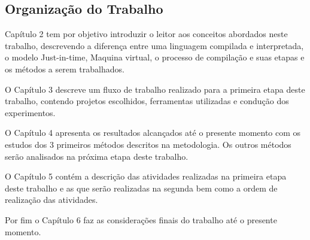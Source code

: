\subsection{Organização do Trabalho}

Capítulo 2 tem por objetivo introduzir o leitor aos conceitos abordados
 neste trabalho, descrevendo a diferença entre uma linguagem compilada e
 interpretada, o modelo Just-in-time, Maquina virtual, o processo de compilação
 e suas etapas e os métodos a serem trabalhados.

O Capítulo 3 descreve um fluxo de trabalho realizado para a primeira etapa
 deste trabalho, contendo projetos escolhidos, ferramentas utilizadas e
 condução dos experimentos.

O Capítulo 4 apresenta os resultados alcançados até o presente momento com
 os estudos dos 3 primeiros métodos descritos na metodologia. Os outros
 métodos serão analisados na próxima etapa deste trabalho.

O Capítulo 5 contém a descrição das atividades realizadas na primeira
 etapa deste trabalho e as que serão realizadas na segunda bem como a ordem
 de realização das atividades.

Por fim o Capítulo 6  faz as considerações finais do trabalho até o presente
 momento.
